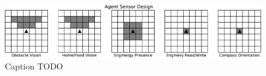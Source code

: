 \begin{figure}
\begin{center}
\includegraphics[width=\textwidth]{img/sense_explanatory}
\caption{
Caption TODO
}
\label{fig:sense_explanatory}
\end{center}
\end{figure}
